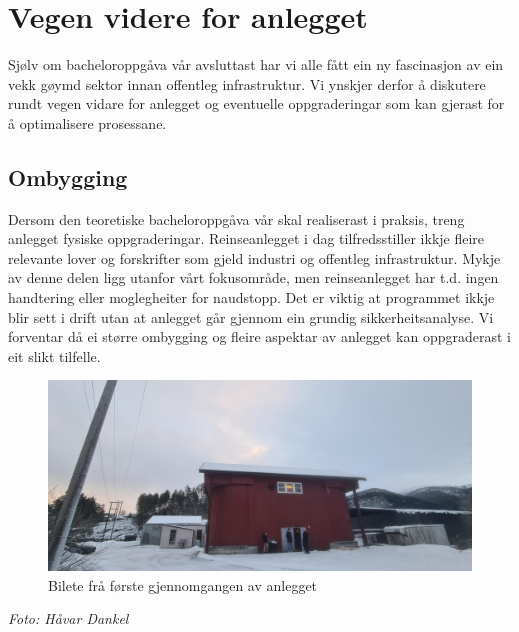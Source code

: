 \section{Vegen videre for anlegget}
\thispagestyle{fancy}

Sjølv om bacheloroppgåva vår avsluttast har vi alle fått ein ny fascinasjon av ein vekk gøymd sektor innan offentleg infrastruktur. 
Vi ynskjer derfor å diskutere rundt vegen vidare for anlegget og eventuelle oppgraderingar som kan gjerast
for å optimalisere prosessane.


\subsection{Ombygging}

Dersom den teoretiske bacheloroppgåva vår skal realiserast i praksis, treng anlegget fysiske oppgraderingar.
Reinseanlegget i dag tilfredsstiller ikkje fleire relevante lover og forskrifter som gjeld industri og offentleg infrastruktur.
Mykje av denne delen ligg utanfor vårt fokusområde, men reinseanlegget har t.d. ingen handtering eller moglegheiter for naudstopp.
Det er viktig at programmet ikkje blir sett i drift utan at anlegget går gjennom ein grundig sikkerheitsanalyse.
Vi forventar då ei større ombygging og fleire aspektar av anlegget kan oppgraderast i eit slikt tilfelle. \newline \newline


\begin{figure}[htbp]
    \centering
    \includegraphics[width=1\textwidth]{Bilder/SandeGjennomgang.jpg}
    \caption{Bilete frå første gjennomgangen av anlegget}\label{fig:Bilete Gjennomgang}
\end{figure}

\begin{center}
    \textit{Foto: Håvar Dankel}
\end{center}


